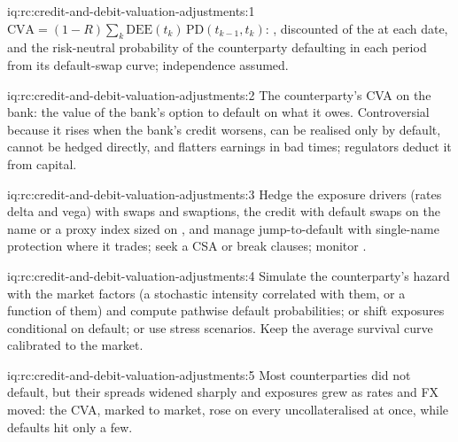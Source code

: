 \begin{solution}{iq:rc:credit-and-debit-valuation-adjustments:1}
$\mathrm{CVA} = (1-R)\sum_k\mathrm{DEE}(t_k)\,\mathrm{PD}(t_{k-1},t_k)$: , discounted
 of the  at each date, and the risk-neutral probability of
the counterparty defaulting in each period from its default-swap curve; independence assumed.
\end{solution}

\begin{solution}{iq:rc:credit-and-debit-valuation-adjustments:2}
The counterparty's CVA on the bank: the value of the bank's option to default on what it owes.
Controversial because it rises when the bank's credit worsens, can be realised only by default,
cannot be hedged directly, and flatters earnings in bad times; regulators deduct it from capital.
\end{solution}

\begin{solution}{iq:rc:credit-and-debit-valuation-adjustments:3}
Hedge the exposure drivers (rates delta and vega) with swaps and swaptions, the credit with
default swaps on the name or a proxy index sized on , and manage jump-to-default with
single-name protection where it trades; seek a CSA or break clauses; monitor .
\end{solution}

\begin{solution}{iq:rc:credit-and-debit-valuation-adjustments:4}
Simulate the counterparty's hazard with the market factors (a stochastic intensity correlated
with them, or a function of them) and compute pathwise default probabilities; or shift
exposures conditional on default; or use stress scenarios. Keep the average survival curve
calibrated to the market.
\end{solution}

\begin{solution}{iq:rc:credit-and-debit-valuation-adjustments:5}
Most counterparties did not default, but their spreads widened sharply and exposures grew as
rates and FX moved: the CVA, marked to market, rose on every uncollateralised  at
once, while defaults hit only a few.
\end{solution}

